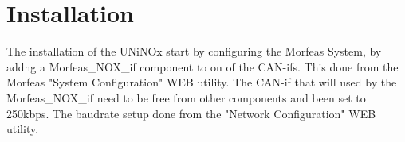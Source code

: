 \section{Installation}
The installation of the UNiNOx start by configuring the Morfeas System, by addng a Morfeas\_NOX\_if component to on of the CAN-ifs.
This done from the Morfeas "System Configuration" WEB utility.
The CAN-if that will used by the Morfeas\_NOX\_if need to be free from other components and been set to 250kbps.
The baudrate setup done from the "Network Configuration" WEB utility.

